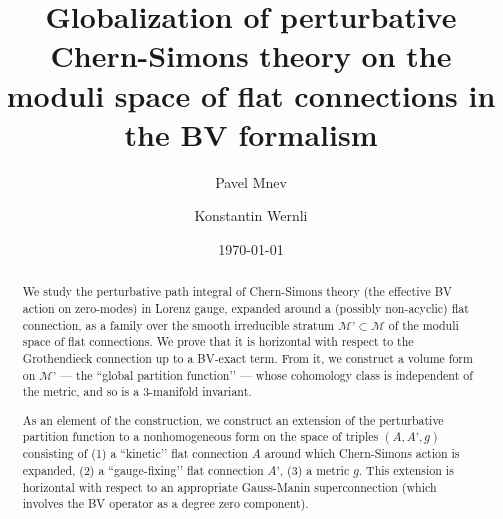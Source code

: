 \documentclass[11pt,a4paper]{amsart}
\title[Globalization in Chern-Simons theory]{
Globalization of perturbative Chern-Simons theory on the moduli space of flat connections in the BV formalism
}
\author[P. Mnev]{Pavel Mnev}
\author[K. Wernli]{Konstantin Wernli}
\date{\today}
\theoremstyle{plain} %
\theoremstyle{definition}
\theoremstyle{remark}
\newcommand{\M}{\mathcal{M}}
\begin{document}
\begin{abstract}


We study the perturbative path integral of Chern-Simons theory (the effective BV action on zero-modes)  in Lorenz gauge, expanded around a (possibly non-acyclic) flat connection, as a family over the smooth irreducible stratum $\M’\subset \M$ of the moduli space of flat connections.
We prove that it is horizontal with respect to the Grothendieck connection up to a BV-exact term. From it, 
we construct a volume form on $\M’$ — the ``global partition function’’ — whose cohomology class is independent of the metric, and so is a 3-manifold invariant. 

As an element of the construction, we construct an extension of the perturbative partition function to a nonhomogeneous form on the space of triples $(A,A’,g)$ consisting of (1) a ``kinetic’’ flat connection $A$ around which Chern-Simons action is expanded, (2) a ``gauge-fixing’’ flat connection $A’$, (3) a metric $g$. This extension is horizontal with respect to an appropriate Gauss-Manin superconnection (which involves the BV operator as a degree zero component).

\end{abstract}
\maketitle
\setcounter{tocdepth}{3}
\tableofcontents
\end{document}
